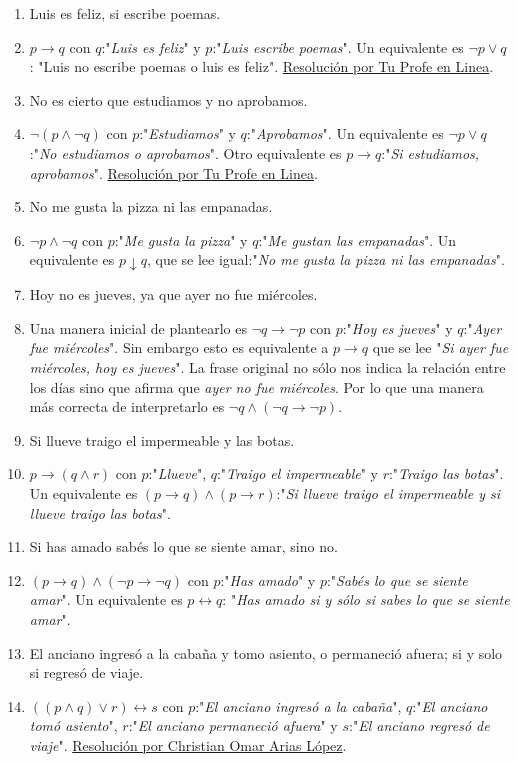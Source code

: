 \documentclass[a4paper]{article}
\newcommand{\answer}{\item[**]}
\newcommand{\then}{\to}
\newcommand{\eq}{\leftrightarrow}
\begin{document}
\begin{enumerate}[resume]
\begin{multicols}{2}
\begin{enumerate} [label=(\alph*)]
		\item Luis es feliz, si escribe poemas.
		\answer $p \then q$ con $q$:"\textit{Luis es feliz}" y $p$:"\textit{Luis escribe poemas}". Un equivalente es $\neg p \lor q$: "Luis no escribe poemas o luis es feliz". \href{https://youtu.be/HXzyX5XGPp8?t=374}{Resolución por Tu Profe en Linea}.

		\item No es cierto que estudiamos y no aprobamos.
		\answer $\neg (p \land \neg q)$ con $p$:"\textit{Estudiamos}" y $q$:"\textit{Aprobamos}". Un equivalente es $\neg p \lor q$:"\textit{No estudiamos o aprobamos}". Otro equivalente es $p \then q$:"\textit{Si estudiamos, aprobamos}". \href{https://youtu.be/HXzyX5XGPp8}{Resolución por Tu Profe en Linea}.

		\item No me gusta la pizza ni las empanadas. 
		\answer $\neg p  \land  \neg q$ con $p$:"\textit{Me gusta la pizza}" y $q$:"\textit{Me gustan las empanadas}". Un equivalente es $p \downarrow  q$, que se lee igual:"\textit{No me gusta la pizza ni las empanadas}".

		\item Hoy no es jueves, ya que ayer no fue miércoles.
		\answer Una manera inicial de plantearlo es $\neg q\then \neg p$ con $p$:"\textit{Hoy es jueves}" y $q$:"\textit{Ayer fue miércoles}". Sin embargo esto es equivalente a $p \then q$ que se lee "\textit{Si ayer fue miércoles, hoy es jueves}". La frase original no sólo nos indica la relación entre los días sino que afirma que \textit{ayer no fue miércoles}. Por lo que una manera más correcta de interpretarlo es $\neg q \land (\neg q\then \neg p)$.

		\item Si llueve traigo el impermeable y las botas. 
		\answer $p \then  ( q  \land  r )$ con $p$:"\textit{Llueve}", $q$:"\textit{Traigo el impermeable}" y $r$:"\textit{Traigo las botas}". Un equivalente es $(p \then q) \land (p \then r )$:"\textit{Si llueve traigo el impermeable y si llueve traigo las botas}".

		\item Si has amado sabés lo que se siente amar, sino no. 
		\answer $( p \then  q )  \land  ( \neg p \then  \neg q )$ con $p$:"\textit{Has amado}" y $p$:"\textit{Sabés lo que se siente amar}". Un equivalente es $p \eq  q$: "\textit{Has amado si y sólo si sabes lo que se siente amar}".

		\item El anciano ingresó a la cabaña y tomo asiento, o permaneció afuera; si y solo si regresó de viaje.
		\answer $((p \land q) \lor r) \eq s$ con $p$:"\textit{El anciano ingresó a la cabaña}", $q$:"\textit{El anciano tomó asiento}", $r$:"\textit{El anciano permaneció afuera}" y $s$:"\textit{El anciano regresó de viaje}". \href{https://youtu.be/TgwraosKUuY?t=331}{Resolución por Christian Omar Arias López}.


\end{enumerate}
\end{multicols}
\end{enumerate}
\end{document}
